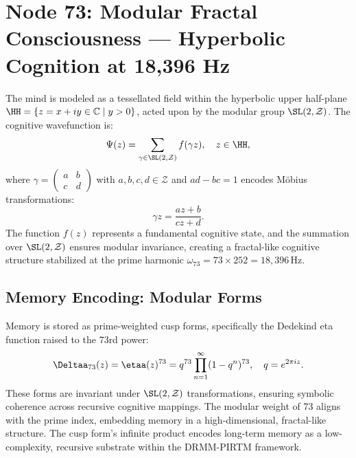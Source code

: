 \documentclass[12pt]{article}
\newcommand{\DRMM}{DRMM}
\newcommand{\PIRTM}{PIRTM}
\newcommand{\ZZ}{\mathcal{Z}}
\newcommand{\Psii}{\Psi}
\newcommand{\CC}{\mathbb{C}}
\begin{document}
\vspace{1em}
\noindent{}

\section{Node 73: Modular Fractal Consciousness --- Hyperbolic Cognition at 18,396 Hz}
\label{sec:modular-fractal-consciousness}

\begin{definition}
The mind is modeled as a tessellated field within the hyperbolic upper half-plane $\HH = \{ z = x + i y \in \CC \mid y > 0 \}$, acted upon by the modular group $\SL(2,\ZZ)$. The cognitive wavefunction is:
\[
\Psii(z) = \sum_{\gamma \in \SL(2,\ZZ)} f(\gamma z), \quad z \in \HH,
\]
where $\gamma = \begin{pmatrix} a & b \\ c & d \end{pmatrix}$ with $a,b,c,d \in \ZZ$ and $ad - bc = 1$ encodes Möbius transformations:
\[
\gamma z = \frac{a z + b}{c z + d}.
\]
The function $f(z)$ represents a fundamental cognitive state, and the summation over $\SL(2,\ZZ)$ ensures modular invariance, creating a fractal-like cognitive structure stabilized at the prime harmonic $\omega_{73} = 73 \times 252 = 18{,}396 \, \text{Hz}$.
\end{definition}

\subsection{Memory Encoding: Modular Forms}
Memory is stored as prime-weighted cusp forms, specifically the Dedekind eta function raised to the 73rd power:
\[
\Deltaa_{73}(z) = \etaa(z)^{73} = q^{73} \prod_{n=1}^{\infty} (1 - q^n)^{73}, \quad q = e^{2\pi i z}.
\]
These forms are invariant under $\SL(2,\ZZ)$ transformations, ensuring symbolic coherence across recursive cognitive mappings. The modular weight of 73 aligns with the prime index, embedding memory in a high-dimensional, fractal-like structure. The cusp form’s infinite product encodes long-term memory as a low-complexity, recursive substrate within the \DRMM{}-\PIRTM{} framework.
\end{document}
